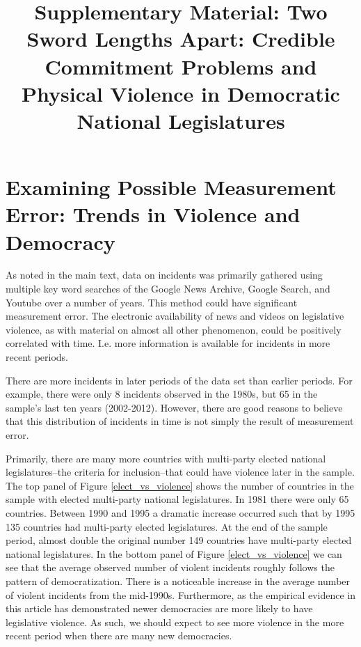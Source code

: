 \documentclass[a4paper]{article}\usepackage[]{graphicx}\usepackage[]{color}
\title{Supplementary Material: Two Sword Lengths Apart: Credible Commitment Problems and Physical Violence in Democratic National Legislatures}
\begin{document}
\maketitle






\section*{Examining Possible Measurement Error: Trends in Violence and Democracy}


As noted in the main text, data on incidents was primarily gathered using multiple key word searches of the Google News Archive, Google Search, and Youtube over a number of years. This method could have significant measurement error. The electronic availability of news and videos on legislative violence, as with material on almost all other phenomenon, could be positively correlated with time. I.e. more information is available for incidents in more recent periods.

There are more incidents in later periods of the data set than earlier periods. For example, there were only 8 incidents observed in the 1980s, but 65 in the sample's last ten years (2002-2012). However, there are good reasons to believe that this distribution of incidents in time is not simply the result of measurement error.

Primarily, there are many more countries with multi-party elected national legislatures--the criteria for inclusion--that could have violence later in the sample. The top panel of Figure \ref{elect_vs_violence} shows the number of countries in the sample with elected multi-party national legislatures. In 1981 there were only 65 countries. Between 1990 and 1995 a dramatic increase occurred such that by 1995 135 countries had multi-party elected legislatures. At the end of the sample period, almost double the original number 149 countries have multi-party elected national legislatures. In the bottom panel of Figure \ref{elect_vs_violence} we can see that the average observed number of violent incidents roughly follows the pattern of democratization. There is a noticeable increase in the average number of violent incidents from the mid-1990s. Furthermore, as the empirical evidence in this article has demonstrated newer democracies are more likely to have legislative violence. As such, we should expect to see more violence in the more recent period when there are many new democracies.
\end{document}
